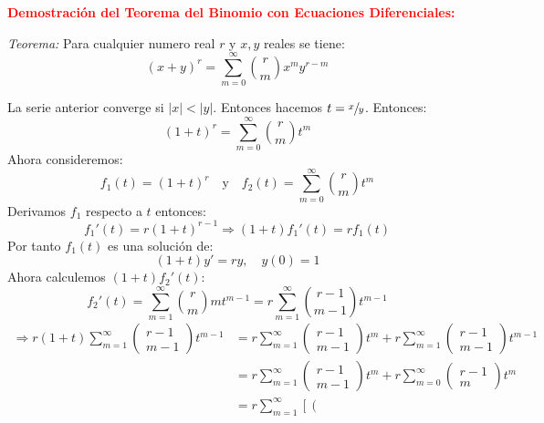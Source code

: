 \documentclass[amssymb,12pt]{article}
\begin{document}
\pagestyle{empty}
\begin{center}
\begin{tcolorbox}
\begin{center}
 \textbf{\textcolor{red}{Demostración del Teorema del Binomio con Ecuaciones Diferenciales:}}
\end{center}
 \emph{Teorema:} Para cualquier numero real $r$ y $x,y$ reales se tiene:
 \[(x+y)^r=\sum_{m=0}^{\infty}\binom{r}{m}x^my^{r-m}\]
\end{tcolorbox}
\end{center}
\begin{tcolorbox}[title=\emph{Demostración:},
 colback=blue!5!white,colframe=blue!75!white]
La serie anterior converge si $|x|<|y|$. Entonces hacemos $t=\sfrac{x}{y}$. Entonces:
\[(1+t)^r=\sum_{m=0}^{\infty}\binom{r}{m}t^m \]
Ahora consideremos:
\[f_1(t)=(1+t)^r\quad\mathrm{y}\quad f_2(t)=\sum_{m=0}^{\infty}\binom{r}{m}t^m \]
Derivamos $f_1$ respecto a $t$ entonces:
\[f_1'(t)=r(1+t)^{r-1}\Rightarrow (1+t)f_1'(t)=rf_1(t) \]
Por tanto $f_1(t)$ es una solución de:
\[(1+t)y'=ry,\quad y(0)=1 \]
Ahora calculemos $(1+t)f_2'(t)$:
\[f_2'(t)=\sum_{m=1}^{\infty}\binom{r}{m}mt^{m-1}=r\sum_{m=1}^{\infty}\binom{r-1}{m-1}t^{m-1} \]
\[\begin{aligned}
\Rightarrow r(1+t) \sum_{m=1}^{\infty}\left(\begin{array}{c}
r-1 \\
m-1
\end{array}\right) t^{m-1} &=r \sum_{m=1}^{\infty}\left(\begin{array}{c}
r-1 \\
m-1
\end{array}\right) t^{m}+r \sum_{m=1}^{\infty}\left(\begin{array}{c}
r-1 \\
m-1
\end{array}\right) t^{m-1} \\
&=r \sum_{m=1}^{\infty}\left(\begin{array}{c}
r-1 \\
m-1
\end{array}\right) t^{m}+r \sum_{m=0}^{\infty}\left(\begin{array}{c}
r-1 \\
m
\end{array}\right) t^{m} \\
&=r \sum_{m=1}^{\infty}\left[\left(\begin{array}{c}

\end{array}
\end{aligned}\]
\end{tcolorbox}
\end{document}
